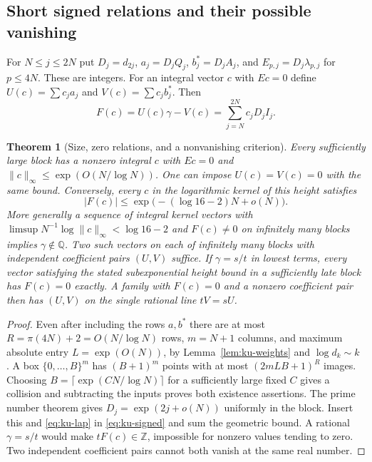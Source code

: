 \documentclass[11pt,a4paper]{article}
\newtheorem{theorem}{Theorem}[section]
\theoremstyle{definition}\newtheorem{definition}[theorem]{Definition}\newtheorem{example}[theorem]{Example}
\theoremstyle{remark}\newtheorem{remark}[theorem]{Remark}
\newcommand{\Q}{\mathbb Q}\newcommand{\Z}{\mathbb Z}\newcommand{\R}{\mathbb R}\newcommand{\N}{\mathbb N}
\begin{document}
\subsection{Short signed relations and their possible vanishing}
For $N\le j\le2N$ put $D_j=d_{2j}$,
$a_j=D_jQ_j$, $b_j^*=D_jA_j$, and $E_{p,j}=D_j\lambda_{p,j}$
for $p\le4N$. These are integers. For an integral vector $c$ with
$Ec=0$ define $U(c)=\sum c_ja_j$ and $V(c)=\sum c_jb_j^*$. Then
\begin{equation}
 F(c)=U(c)\gamma-V(c)=\sum_{j=N}^{2N}c_jD_j I_j .
 \label{eq:ku-signed}
\end{equation}

\begin{theorem}[Size, zero relations, and a nonvanishing criterion]
\label{thm:ku-siegel}
Every sufficiently large block has a nonzero integral $c$ with $Ec=0$ and
$\|c\|_\infty\le\exp(O(N/\log N))$. One can impose $U(c)=V(c)=0$
with the same bound. Conversely, every $c$ in the logarithmic kernel
of this height satisfies
\[
 |F(c)|\le\exp\bigl(- (\log16-2)N+o(N)\bigr).
\]
More generally a sequence of integral kernel vectors with
$\limsup N^{-1}\log\|c\|_\infty<\log16-2$ and $F(c)\ne0$ on infinitely
many blocks implies $\gamma\notin\Q$. Two such vectors on each of
infinitely many blocks with independent coefficient pairs $(U,V)$ suffice.
If $\gamma=s/t$ in lowest terms, every vector satisfying the stated subexponential height bound in a
sufficiently late block has $F(c)=0$ exactly. A family with $F(c)=0$
and a nonzero coefficient pair then has $(U,V)$ on the single rational
line $tV=sU$.
\end{theorem}
\begin{proof}
Even after including the rows $a,b^*$ there are at most
$R=\pi(4N)+2=O(N/\log N)$ rows, $m=N+1$ columns, and maximum absolute
entry $L=\exp(O(N))$, by Lemma~\ref{lem:ku-weights} and
$\log d_k\sim k$ \cite{PNT}. A box $\{0,\ldots,B\}^m$ has
$(B+1)^m$ points with at most $(2mLB+1)^R$ images. Choosing
$B=\lceil\exp(CN/\log N)\rceil$ for a sufficiently large fixed $C$ gives
a collision and subtracting the inputs proves both existence assertions.
The prime number theorem gives $D_j=\exp(2j+o(N))$ uniformly in the
block. Insert this and \eqref{eq:ku-lap} in \eqref{eq:ku-signed} and sum
the geometric bound. A rational $\gamma=s/t$ would make
$tF(c)\in\Z$, impossible for nonzero values tending to zero. Two
independent coefficient pairs cannot both vanish at the same real number.
\end{proof}
\end{document}
